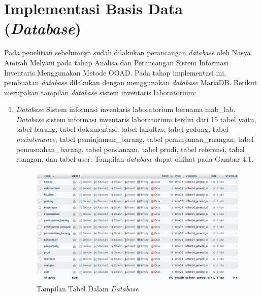 \section{Implementasi Basis Data (\textit{Database})}
Pada penelitian sebelumnya sudah dilakukan perancangan \textit{database} oleh Nasya Amirah Melyani pada tahap Analisa dan Perancangan Sistem Informasi Inventaris Menggunakan Metode OOAD. Pada tahap implementasi ini, pembuatan \textit{database} dilakukan dengan menggunakan \textit{database} MariaDB. Berikut merupakan tampilan \textit{database} sistem inventaris laboratorium:
\begin{enumerate}
  \item \textit{Database} Sistem informasi inventaris laboratorium bernama mab\_lab. \textit{Database} sistem informasi inventaris laboratorium terdiri dari 15 tabel yaitu, tabel barang, tabel dokumentasi, tabel fakultas, tabel gedung, tabel \textit{maintenance}, tabel peminjaman\_barang, tabel peminjaman\_ruangan, tabel pemusnahan\_barang, tabel pendanaan, tabel prodi, tabel referensi, tabel ruangan, dan tabel user. Tampilan \textit{database} dapat dilihat pada Gambar 4.1.

        \begin{figure}
          \centering
          \includegraphics[width=0.82\linewidth]{konten//gambar/Tampilan tabel-tabel database.png}
          \caption{Tampilan Tabel Dalam \textit{Database}}
          \label{fig:enter-label}
        \end{figure}


\end{enumerate}
